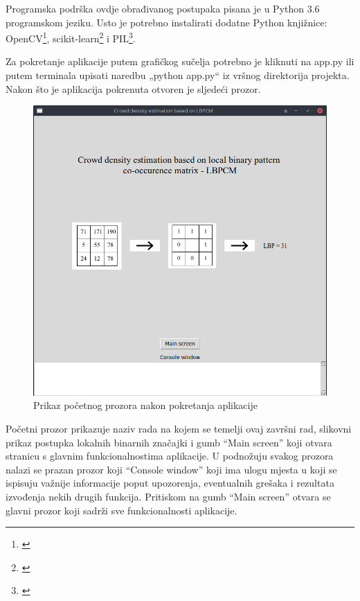 \documentclass[times, utf8, zavrsni]{fer}
\begin{document}
Programska podrška ovdje obrađivanog postupaka pisana je u Python 3.6 
programskom jeziku. Usto je potrebno instalirati dodatne Python 
knjižnice: OpenCV\footnote{\cite{opencv.org}}, scikit-learn\footnote{\cite{scikit}} i PIL\footnote{\cite{pil}}.

Za pokretanje aplikacije putem grafičkog sučelja potrebno je kliknuti 
na app.py ili putem terminala upisati naredbu „python app.py“ iz 
vršnog direktorija projekta. Nakon što je aplikacija pokrenuta 
otvoren je sljedeći prozor. 

\begin{figure}[ht]
\centering
\includegraphics[scale=0.35]{img/startpage.png}
\caption{Prikaz početnog prozora nakon pokretanja aplikacije}
\end{figure}

\newpage

Početni prozor prikazuje naziv rada na kojem se temelji ovaj završni rad, 
slikovni prikaz postupka lokalnih binarnih značajki i gumb \enquote{Main screen}
koji otvara stranicu s glavnim funkcionalnostima aplikacije. U podnožuju svakog
prozora nalazi se prazan prozor koji \enquote{Console window} koji ima ulogu
mjesta u koji se ispisuju važnije informacije poput upozorenja, eventualnih 
grešaka i rezultata izvođenja nekih drugih funkcija. Pritiskom na gumb \enquote{Main screen}
otvara se glavni prozor koji sadrži sve funkcionalnosti aplikacije.
\end{document}
